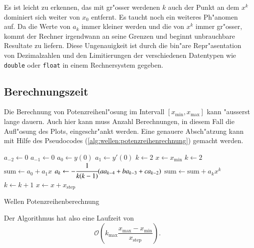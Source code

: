 Es ist leicht zu erkennen, das mit gr"osser werdenen $k$ auch der Punkt an dem 
$x^k$ dominiert sich weiter von $x_0$ entfernt. Es taucht noch ein weiteres 
Ph"anomen auf. Da die Werte von $a_k$ immer kleiner werden und die von $x^k$ 
immer gr"osser, kommt der Rechner irgendwann an seine Grenzen und beginnt 
unbrauchbare Resultate zu liefern. Diese Ungenauigkeit ist durch die bin"are 
Repr"asentation von Dezimalzahlen und den Limitierungen der verschiedenen 
Datentypen wie \texttt{double} oder \texttt{float} in einem Rechnersystem 
gegeben.

\subsection{Berechnungszeit}
Die Berechnung von Potenzreihenl"osung im Intervall
$[x_{\text{min}},x_{\text{max}}]$ kann "ausserst lange dauern. Auch hier kann
muss Anzahl Berechnungen, in diesem Fall die Aufl"osung des Plots,
eingeschr"ankt werden. Eine genauere Absch"atzung kann mit Hilfe des
Pseudocodes (\ref{alg:wellen:potenzreihenrechnung}) gemacht werden.

\begin{algorithm}
	\begin{algorithmic}[1]
		\State $a_{-2} \gets 0$
		\State $a_{-1} \gets 0$
		\State $a_0 \gets y(0)$
		\State $a_1 \gets y'(0)$
		\State $k \gets 2$
		\State $x \gets x_{\text{min}}$
			\State $k \gets 2$
			\State $\text{sum} \gets a_0 + a_1x$
				\State $a_k \gets -\cfrac{1}{k(k-1)}			
				(aa_{k-4}+ba_{k-3}+ca_{k-2})$
				\State $\text{sum} \gets \text{sum} + a_k x^k$
				\State $k \gets k + 1$
			\EndFor
			\State $x \gets x + x_{\text{step}}$
		\EndFor
	\end{algorithmic}
	\caption{Wellen Potenzreihenberechnung} 
	\label{alg:wellen:potenzreihenrechnung}
\end{algorithm}

Der Algorithmus hat also eine Laufzeit von
\begin{equation*}
	\mathcal{O}\left(k_{\text{max}}\frac{x_{\text{max}}-x_{\text{min}}} 
	{x_{\text{step}}}\right).
\end{equation*}
